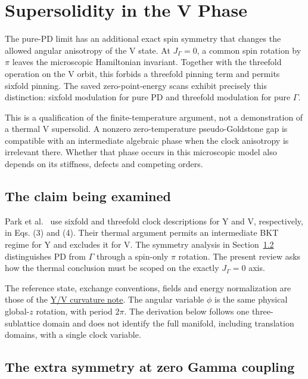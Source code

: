 \clearpage

\section{Supersolidity in the V Phase}\label{sec-nbcp-v-phase}

The pure-PD limit has an additional exact spin symmetry that changes the
allowed angular anisotropy of the V state. At \(J_\Gamma=0\), a common
spin rotation by \(\pi\) leaves the microscopic Hamiltonian invariant.
Together with the threefold operation on the V orbit, this forbids a
threefold pinning term and permits sixfold pinning. The saved
zero-point-energy scans exhibit precisely this distinction: sixfold
modulation for pure PD and threefold modulation for pure \(\Gamma\).

This is a qualification of the finite-temperature argument, not a
demonstration of a thermal V supersolid. A nonzero zero-temperature
pseudo-Goldstone gap is compatible with an intermediate algebraic phase
when the clock anisotropy is irrelevant there. Whether that phase occurs
in this microscopic model also depends on its stiffness, defects and
competing orders.

\subsection{The claim being examined}\label{the-claim-being-examined}

Park et al.~\cite{park2026} use sixfold and threefold clock descriptions for Y
and V, respectively, in Eqs. (3) and (4). Their thermal argument permits
an intermediate BKT regime for Y and excludes it for V. The symmetry
analysis in Section~\ref{sec-nbcp-v-symmetry} distinguishes PD from
\(\Gamma\) through a spin-only \(\pi\) rotation. The present review asks
how the thermal conclusion must be scoped on the exactly \(J_\Gamma=0\)
axis.

The reference state, exchange conventions, fields and energy
normalization are those of the \hyperref[sec-nbcp-gap-appendix]{Y/V
curvature note}. The angular variable \(\phi\) is the same physical
global-\(z\) rotation, with period \(2\pi\). The derivation below
follows one three-sublattice domain and does not identify the full
manifold, including translation domains, with a single clock variable.

\subsection{The extra symmetry at zero Gamma
coupling}\label{sec-nbcp-v-symmetry}

